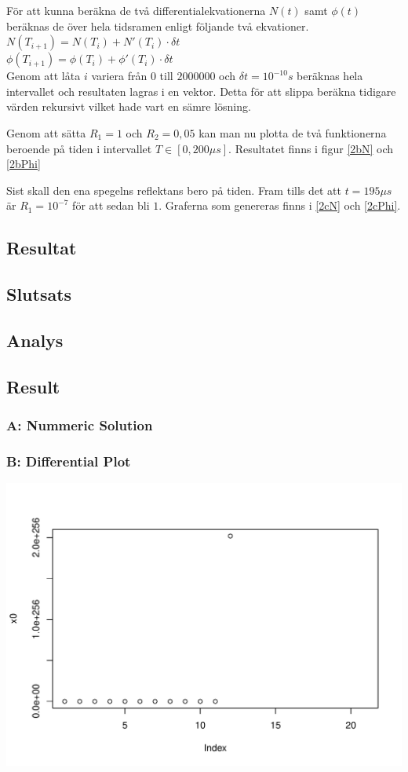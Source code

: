 \documentclass[12pt]{article}
\begin{document}
För att kunna beräkna de två differentialekvationerna $N(t)$ samt $\phi(t)$ beräknas de över hela tidsramen enligt följande två ekvationer.\\
$N(T_{i+1})=N(T_i)+N'(T_i) \cdot \delta t $\\
$\phi(T_{i+1})=\phi(T_i)+\phi'(T_i) \cdot \delta t $\\

Genom att låta $i$ variera från $0$ till $2000000$ och $\delta t=10^{-10}s$ beräknas hela intervallet och resultaten lagras i en vektor. Detta för att slippa beräkna tidigare värden rekursivt vilket hade vart en sämre lösning.

Genom att sätta $R_1 = 1$ och $R_2 = 0,05$ kan man nu plotta de två funktionerna beroende på tiden i intervallet $T \in [0,200 \mu s]$. Resultatet finns i figur \ref{2bN} och \ref{2bPhi} 

Sist skall den ena spegelns reflektans bero på tiden. Fram tills det att $t=195 \mu s$ är $R_1=10^{-7}$ för att sedan bli $1$. Graferna som genereras finns i \ref{2cN} och \ref{2cPhi}.

\subsection{Resultat}

\subsection{Slutsats}

\subsection{Analys}


\subsection{Result}
\subsubsection{A: Nummeric Solution}

\subsubsection{B: Differential Plot}
\includegraphics[scale=0.6]{N.pdf}
\end{document}
